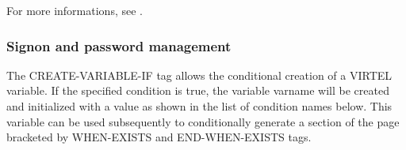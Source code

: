 \documentclass[letterpaper,10pt,english]{sphinxmanual}
\begin{document}
\begin{sphinxVerbatim}[commandchars=\\\{\}]
\PYG{p}{]}
\end{sphinxVerbatim}


For more informations, see {\hyperref[\detokenize{User_Guide:v457ug-create-variable-if}]{}}.


\subsubsection{Signon and password management}
\label{\detokenize{User_Guide:signon-and-password-management}}

\begin{sphinxVerbatim}[commandchars=\\\{\}]
  
\end{sphinxVerbatim}

The CREATE-VARIABLE-IF tag allows the conditional creation of a VIRTEL variable. If the specified condition is true, the variable varname will be created and initialized with a value as shown in the list of condition names below. This variable can be used subsequently to conditionally generate a section of the page bracketed by WHEN-EXISTS and END-WHEN-EXISTS tags.
\end{document}
